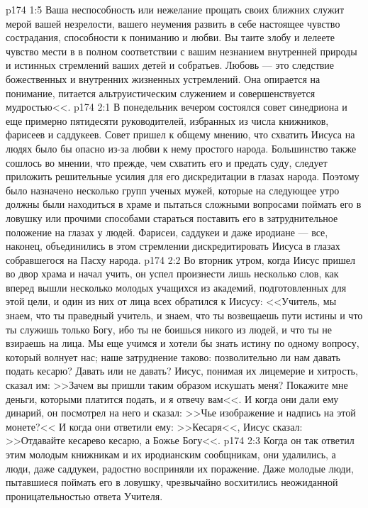 \vs p174 1:5 Ваша неспособность или нежелание прощать своих ближних служит мерой вашей незрелости, вашего неумения развить в себе настоящее чувство сострадания, способности к пониманию и любви. Вы таите злобу и лелеете чувство мести в в полном соответствии с вашим незнанием внутренней природы и истинных стремлений ваших детей и собратьев. Любовь --- это следствие божественных и внутренних жизненных устремлений. Она опирается на понимание, питается альтруистическим служением и совершенствуется мудростью<<.
\vs p174 2:1 В понедельник вечером состоялся совет синедриона и еще примерно пятидесяти руководителей, избранных из числа книжников, фарисеев и саддукеев. Совет пришел к общему мнению, что схватить Иисуса на людях было бы опасно из\hyp{}за любви к нему простого народа. Большинство также сошлось во мнении, что прежде, чем схватить его и предать суду, следует приложить решительные усилия для его дискредитации в глазах народа. Поэтому было назначено несколько групп ученых мужей, которые на следующее утро должны были находиться в храме и пытаться сложными вопросами поймать его в ловушку или прочими способами стараться поставить его в затруднительное положение на глазах у людей. Фарисеи, саддукеи и даже иродиане --- все, наконец, объединились в этом стремлении дискредитировать Иисуса в глазах собравшегося на Пасху народа.
\vs p174 2:2 Во вторник утром, когда Иисус пришел во двор храма и начал учить, он успел произнести лишь несколько слов, как вперед вышли несколько молодых учащихся из академий, подготовленных для этой цели, и один из них от лица всех обратился к Иисусу: <<Учитель, мы знаем, что ты праведный учитель, и знаем, что ты возвещаешь пути истины и что ты служишь только Богу, ибо ты не боишься никого из людей, и что ты не взираешь на лица. Мы еще учимся и хотели бы знать истину по одному вопросу, который волнует нас; наше затруднение таково: позволительно ли нам давать подать кесарю? Давать или не давать? Иисус, понимая их лицемерие и хитрость, сказал им: >>Зачем вы пришли таким образом искушать меня? Покажите мне деньги, которыми платится подать, и я отвечу вам<<. И когда они дали ему динарий, он посмотрел на него и сказал: >>Чье изображение и надпись на этой монете?<< И когда они ответили ему: >>Кесаря<<, Иисус сказал: >>Отдавайте кесарево кесарю, а Божье Богу<<.
\vs p174 2:3 Когда он так ответил этим молодым книжникам и их иродианским сообщникам, они удалились, а люди, даже саддукеи, радостно восприняли их поражение. Даже молодые люди, пытавшиеся поймать его в ловушку, чрезвычайно восхитились неожиданной проницательностью ответа Учителя.
